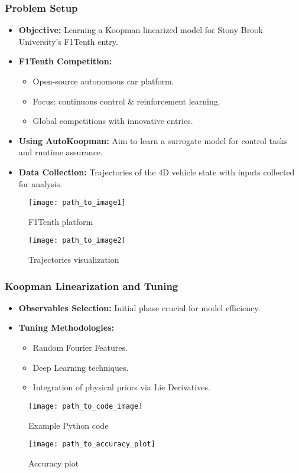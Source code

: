 \documentclass[shortpres,aspectratio=43]{beamer}
\begin{document}
\begin{frame}
\frametitle{Problem Setup}
\begin{itemize}
    \item<1-> \textbf{Objective:} Learning a Koopman linearized model for Stony Brook University's F1Tenth entry.
    \item<2-> \textbf{F1Tenth Competition:}
    \begin{itemize}
        \item Open-source autonomous car platform.
        \item Focus: continuous control \& reinforcement learning.
        \item Global competitions with innovative entries.
    \end{itemize}
    \item<3-> \textbf{Using AutoKoopman:} Aim to learn a surrogate model for control tasks and runtime assurance.
    \item<4-> \textbf{Data Collection:} Trajectories of the 4D vehicle state with inputs collected for analysis.
\end{itemize}
\begin{figure}
  \centering
  \texttt{[image: path\_to\_image1]} %
  \caption{F1Tenth platform}
\end{figure}
\begin{figure}
  \centering
  \texttt{[image: path\_to\_image2]} %
  \caption{Trajectories visualization}
\end{figure}
\end{frame}

\begin{frame}
\frametitle{Koopman Linearization and Tuning}
\begin{itemize}
    \item<1-> \textbf{Observables Selection:} Initial phase crucial for model efficiency.
    \item<2-> \textbf{Tuning Methodologies:} 
    \begin{itemize}
        \item Random Fourier Features.
        \item Deep Learning techniques.
        \item Integration of physical priors via Lie Derivatives.
    \end{itemize}
\end{itemize}
\begin{figure}
  \centering
  \texttt{[image: path\_to\_code\_image]} %
  \caption{Example Python code}
\end{figure}
\begin{figure}
  \centering
  \texttt{[image: path\_to\_accuracy\_plot]} %
  \caption{Accuracy plot}
\end{figure}
\end{frame}
\end{document}
